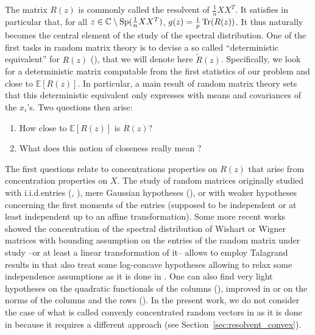 \documentclass[a4papaer, titlepage]{book}
\begin{document}
The matrix $R(z)$ is commonly called the resolvent of $\frac{1}{n}XX^T$. It satisfies in particular that, for all $z \in \mathbb C \setminus \operatorname{Sp}(\frac{1}{n}XX^T)$, $g(z) = \frac{1}{p} \operatorname{Tr}(R(z))$. It thus naturally becomes the central element of the study of the spectral distribution. 
One of the first tasks in random matrix theory is to devise a so called ``deterministic equivalent'' for $R(z)$ (\cite{HAC07}), that we will denote here $\tilde R(z)$. Specifically, we look for a deterministic matrix computable from the first statistics of our problem and close to $\mathbb E[R(z)]$. In particular, a main result of random matrix theory sets that this deterministic equivalent only expresses with means and covariances of the $x_i$'s. Two questions then arise:
\begin{enumerate}
  \item How close to $\mathbb E[R(z)]$ is $R(z)$?
  \item What does this notion of closeness really mean ?
\end{enumerate}
The first questions relate to concentrations properties on $R(z)$ that arise from concentration properties on $X$. The study of random matrices originally studied with i.i.d.\@ entries (\cite{MAR67}, \cite{YIN86}), mere Gaussian hypotheses (\cite{BOU96}), or with weaker hypotheses concerning the first moments of the entries (supposed to be independent or at least independent up to an affine transformation). 
Some more recent works showed the concentration of the spectral distribution of Wishart or Wigner matrices with bounding assumption on the entries of the random matrix under study --or at least a linear transformation of it-- allows to employ Talagrand results in \cite{guionnet2000concentration,guntuboyina2009concentration} that also treat some log-concave hypotheses allowing to relax some independence assumptions as it is done in \cite{ADA15}. One can also find very light hypotheses on the quadratic functionals of the columns (\cite{Bai08t}), improved in \cite{YAS16} or on the norms of the columns and the rows (\cite{ADA11}). 
In the present work, we do not consider the case of what is called convexly concentrated random vectors in \cite{VU2014,MEC11,ADA11} as it is done in \cite{guionnet2000concentration} because it requires a different approach (see Section~\ref{sec:resolvent_convex}). 
\end{document}
